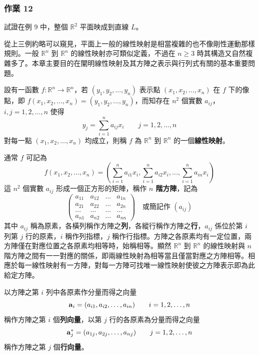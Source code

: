 \subsubsection*{作業 12}\label{hw:b6-1-12}
試證在例 9 中，整個 $\mathbb{R}^2$ 平面映成到直線 $L$。

從上三例約略可以窺見，平面上一般的線性映射是相當複雜的也不像剛性運動那樣規則。一般 $\mathbb{R}^n$ 到 $\mathbb{R}^n$ 的線性映射亦可類似定義，不過在 $n \ge 3$ 時其構造又自然複雜多了。本章主要目的在闡明線性映射及其方陣之表示與行列式有關的基本重要問題。

\begin{definition}\label{def:b6-1-3}
設有一函數 $f: \mathbb{R}^n \longrightarrow \mathbb{R}^n$，若 $(y_1, y_2, \dots, y_n)$ 表示點 $(x_1, x_2, \dots, x_n)$ 在 $f$ 下的像點，即 $f(x_1, x_2, \dots, x_n) = (y_1, y_2, \dots, y_n)$，而知存在 $n^2$ 個實數 $a_{ij}$，$i, j = 1, 2, \dots, n$ 使得
\begin{equation}
y_j = \sum_{i=1}^n a_{ij} x_i \qquad j = 1, 2, \dots, n \label{eq:b6-1-1-11}
\end{equation}
對每一點 $(x_1, x_2, \dots, x_n)$ 均成立，則稱 $f$ 為 $\mathbb{R}^n$ 到 $\mathbb{R}^n$ 的一個\textbf{線性映射}。
\end{definition}

通常 $f$ 可記為
\[ f(x_1, x_2, \dots, x_n) = \left( \sum_{i=1}^n a_{i1} x_i, \sum_{i=1}^n a_{i2} x_i, \dots, \sum_{i=1}^n a_{in} x_i \right) \]
這 $n^2$ 個實數 $a_{ij}$ 形成一個正方形的矩陣，稱作 \textbf{$n$ 階方陣}，記為
\begin{equation}
\begin{pmatrix}
a_{11} & a_{12} & \dots & a_{1n} \\
a_{21} & a_{22} & \dots & a_{2n} \\
\dots & \dots & \dots & \dots \\
a_{n1} & a_{n2} & \dots & a_{nn}
\end{pmatrix} \quad \text{或簡記作 } (a_{ij}) \label{eq:b6-1-1-12}
\end{equation}
其中 $a_{ij}$ 稱為原素，各橫列稱作方陣之\textbf{列}，各縱行稱作方陣之\textbf{行}，$a_{ij}$ 係位於第 $i$ 列第 $j$ 行的原素，$i$ 稱作列指標，$j$ 稱作行指標。方陣之各原素均有一定位置，兩方陣僅在對應位置之各原素均相等時，始稱相等。顯然 $\mathbb{R}^n$ 到 $\mathbb{R}^n$ 的線性映射與 $n$ 階方陣之間有一一對應的關係，即兩線性映射為相等當且僅當對應之方陣相等。相應於每一線性映射有一方陣，對每一方陣可找唯一線性映射使彼之方陣表示即為此給定方陣。

以方陣之第 $i$ 列中各原素作分量而得之向量
\begin{equation}
\boldsymbol{\mathbf{a}}_i = (a_{i1}, a_{i2}, \dots, a_{in}) \qquad i=1, 2, \dots, n \label{eq:b6-1-1-13}
\end{equation}
稱作方陣之第 $i$ 個\textbf{列向量}，以第 $j$ 行的各原素為分量而得之向量
\begin{equation}
\boldsymbol{\mathbf{a}}_j^* = (a_{1j}, a_{2j}, \dots, a_{nj}) \qquad j=1, 2, \dots, n \label{eq:b6-1-1-14}
\end{equation}
稱作方陣之第 $j$ 個\textbf{行向量}。

